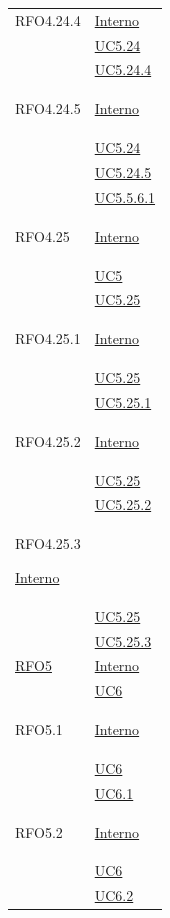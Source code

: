 \begin{longtable}{|>{\centering}m{5cm}|m{5cm}<{\centering}|}
\hypertarget{RFO4.24.4}{RFO4.24.4} &  \hyperlink{Interno}{Interno}\\
&\hyperref[UC5.24]{UC5.24}\\
&\hyperref[UC5.24.4]{UC5.24.4}\\ \hline

\hypertarget{RFO4.24.5}{RFO4.24.5} & \hyperlink{Interno}{Interno}\\
&\hyperref[UC5.24]{UC5.24}\\
&\hyperref[UC5.24.5]{UC5.24.5}\\
&\hyperref[UC5.5.6.1]{UC5.5.6.1}\\ \hline

\hypertarget{RFO4.25}{RFO4.25} & \hyperlink{Interno}{Interno}\\
&\hyperref[UC5]{UC5}\\
&\hyperref[UC5.25]{UC5.25}\\ \hline

\hypertarget{RFO4.25.1}{RFO4.25.1} &  \hyperlink{Interno}{Interno}\\
&\hyperref[UC5.25]{UC5.25}\\
&\hyperref[UC5.25.1]{UC5.25.1}\\ \hline

\hypertarget{RFO4.25.2}{RFO4.25.2} & \hyperlink{Interno}{Interno}\\
&\hyperref[UC5.25]{UC5.25}\\
&\hyperref[UC5.25.2]{UC5.25.2}\\ \hline

\hypertarget{RFO4.25.3}{RFO4.25.3}   \hyperlink{Interno}{Interno}\\
&\hyperref[UC5.25]{UC5.25}\\
&\hyperref[UC5.25.3]{UC5.25.3}\\ \hline

\hyperlink{RFO5}{RFO5} & \hyperlink{Interno}{Interno}\\
& \hyperref[UC6]{UC6}\\ \hline

\hypertarget{RFO5.1}{RFO5.1}&  \hyperlink{Interno}{Interno}\\
& \hyperref[UC6]{UC6}\\
& \hyperref[UC6.1]{UC6.1}\\ \hline

\hypertarget{RFO5.2}{RFO5.2} &  \hyperlink{Interno}{Interno}\\
& \hyperref[UC6]{UC6}\\
& \hyperref[UC6.2]{UC6.2}\\ \hline


\end{longtable}
